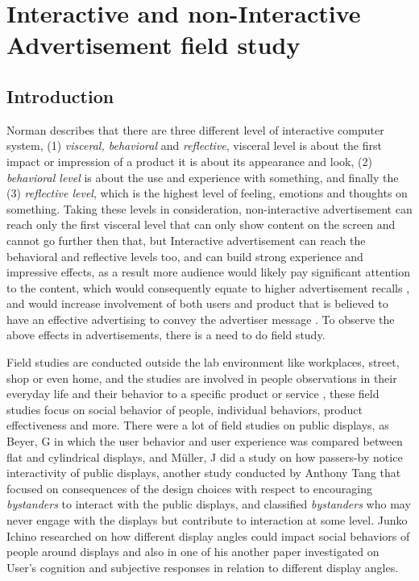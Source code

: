 \chapter{Interactive and non-Interactive Advertisement field study} %

\label{Chapter8} %
\newpage




\section{Introduction}
Norman \cite{norman} describes that there are three different level of interactive computer system, (1) \emph{visceral, behavioral} and \emph{reflective}, visceral level is about the first impact or impression of a product it is about its appearance and look, (2) \emph{behavioral level} is about the use and experience with something, and finally the (3) \emph{reflective level}, which is the highest level of feeling, emotions and thoughts on something. Taking these levels in consideration, non-interactive advertisement can reach only the first visceral level that can only show content on the screen and cannot go further then that, but Interactive advertisement can reach the behavioral and reflective levels too, and can build strong experience and impressive effects, as a result more audience would likely pay significant attention to the content, which would consequently equate to higher advertisement recalls \cite{add_effectivenss}, and would increase involvement of both users and product that is believed to have an effective advertising to convey the advertiser message \cite{audience_involvement}. To observe the above effects in advertisements, there is a need to do field study.

Field studies are conducted outside the lab environment like workplaces, street, shop or even home, and the studies are involved in people observations in their everyday life and their behavior to a specific product or service \cite{field_study}, these field studies focus on social behavior of people, individual behaviors, product effectiveness and more. There were a lot of field studies on public displays, as Beyer, G \cite{CylindricalScreen} in which the user behavior and user experience was compared between flat and cylindrical displays, and Müller, J \cite{LookingGlass} did a study on how passers-by notice interactivity of public displays, another study conducted by Anthony Tang \cite{Bystanders} that focused on consequences of the design choices with respect to encouraging \emph{bystanders} to interact with the public displays, and classified \emph{bystanders} who may never engage with the displays but contribute to interaction at some level. Junko Ichino \cite{DisplayAngleEffect} researched on how different display angles could impact social behaviors of people around displays and also in one of his another paper \cite{DisplayAngleEffect2} investigated on User's cognition and subjective responses in relation to different display angles.

